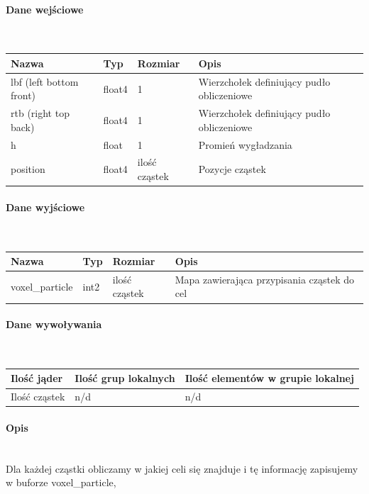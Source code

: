 \documentclass[polish, 12pt]{aghthesis}
\begin{document}
			\paragraph{Dane wejściowe} \ \\
				\begin{tabular}{| p{} | p{} | p{} | p{} |}
				\hline
					Nazwa & Typ & Rozmiar & Opis \\
				\hline
					lbf (left bottom front)& float4 & 1 & Wierzchołek definiujący pudło obliczeniowe \\ 
				\hline
					rtb (right top back) & float4 & 1 & Wierzchołek definiujący pudło obliczeniowe  \\ 
				\hline
					h & float & 1 & Promień wygładzania \\ 
				\hline
					position & float4 & ilość cząstek & Pozycje cząstek \\
				\hline
				\end{tabular}
			\paragraph{Dane wyjściowe} \ \\
				\begin{tabular}{| p{} | p{} | p{} | p{} |}
				\hline
					Nazwa & Typ & Rozmiar & Opis \\
				\hline
					voxel\_particle & int2 & ilość cząstek & Mapa zawierająca przypisania cząstek do cel \\ 
				\hline
				\end{tabular}
			\paragraph{Dane wywoływania} \ \\
				\begin{tabular}{| p{} | p{} | p{}|}
				\hline
					Ilość jąder & Ilość grup lokalnych & Ilość elementów w grupie lokalnej \\
				\hline
					Ilość cząstek & n/d & n/d \\ 
				\hline
				\end{tabular}
			\paragraph{Opis} \ \\
				\indent Dla każdej cząstki obliczamy w jakiej celi się znajduje i tę informację zapisujemy w buforze voxel\_particle,
\end{document}
